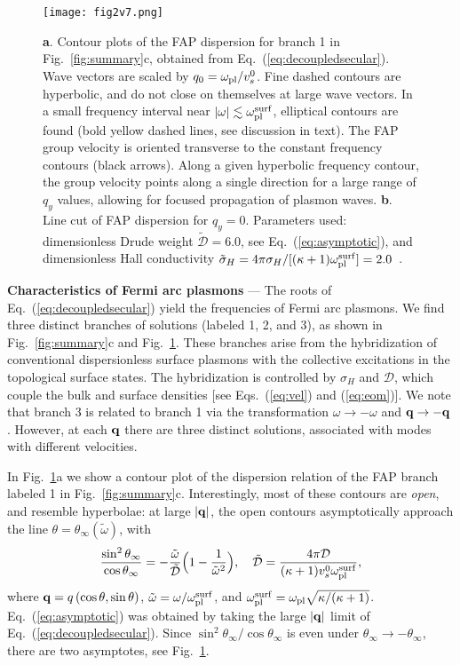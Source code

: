 \documentclass[aps,twocolumn,prl,groupedaddress]{revtex4}
\newcommand{\be}{\begin{equation}}
\newcommand{\ee}{\end{equation}}
\renewcommand{\vec}[1]{{\bf #1}}
\begin{document}
\begin{figure}[t]
\texttt{[image: fig2v7.png]}
\caption{{\bf a}. Contour plots of the FAP dispersion for branch 1 
in Fig.~\ref{fig:summary}c, obtained from Eq.~(\ref{eq:decoupledsecular}). 
Wave vectors are scaled by $q_0=\omega_{\rm pl}/v_s^{0}$.
Fine dashed contours are hyperbolic, and do not close on themselves at large wave vectors.
In a small frequency interval near $|\omega| \lesssim \omega_{\rm pl}^{\rm surf}$, elliptical contours are found (bold yellow dashed lines, see discussion in text).
The FAP group velocity is oriented transverse to the constant frequency contours (black arrows).
Along a given hyperbolic frequency contour, the group velocity points along a single direction for a large range of $q_y$ values, allowing for focused propagation of plasmon waves.
{\bf b}. Line cut of FAP dispersion for $q_y=0$. 
Parameters used: dimensionless Drude weight $\tilde{\mathcal{D}} = 6.0$, see Eq.~(\ref{eq:asymptotic}), and dimensionless Hall conductivity $\tilde{\sigma}_H =4\pi \sigma_H/[(\kappa +1) \omega_{\rm pl}^{\rm surf} ]=2.0$~\cite{parameters}.
}
\label{fig:dispersion}
\end{figure}

\vspace{2mm}
{\bf Characteristics of Fermi arc plasmons} --- The roots of Eq.~(\ref{eq:decoupledsecular}) yield the frequencies of Fermi arc plasmons. We find three distinct branches of solutions (labeled 1, 2, and 3), as shown in Fig.~\ref{fig:summary}c and Fig.~\ref{fig:dispersion}. 
These branches arise from the hybridization of conventional dispersionless surface plasmons with the collective excitations in the topological surface states. 
The hybridization is controlled by $\sigma_H$ and $\mathcal{D}$, which couple the bulk and surface densities [see Eqs.~(\ref{eq:vel}) and (\ref{eq:eom})]. 
We note that branch 3 is related to branch 1 via the transformation $\omega \to - \omega$ and $\vec q \to -\vec q$.
However, at each $\vec q$ there are three distinct solutions, associated with modes with different velocities.

In Fig.~\ref{fig:dispersion}a we show a contour plot of 
the dispersion relation of the FAP branch labeled 1 in Fig.~\ref{fig:summary}c. 
Interestingly, most of these contours are {\it open}, and resemble hyperbolae: at large $|\vec q|$, the open contours asymptotically approach the line $\theta = \theta_\infty(\tilde\omega)$, with 
\be
\frac{\sin^2\theta_\infty}{\cos\theta_\infty}= - \frac{\tilde{\omega}}{\tilde{\mathcal{D}}} \Big( 1- \frac{1}{\tilde{\omega}^2}\Big),\quad \tilde{\mathcal{D}} = \frac{4\pi \mathcal{D}}{(\kappa+1) v_s^0 \omega_{\rm pl}^{\rm surf}},
\label{eq:asymptotic}
\ee
where $\vec{q} = q\,(\cos\theta, \sin\theta)$,  $ \tilde\omega = \omega/\omega_{\rm pl}^{\rm surf}$, and $ \omega_{\rm pl}^{\rm surf}= \omega_{\rm pl}\sqrt{\kappa/(\kappa+1)}$. 
Eq.~(\ref{eq:asymptotic}) was obtained by taking the large $|\vec q|$ limit of Eq.~(\ref{eq:decoupledsecular}). 
Since $\sin^2\theta_\infty/\cos\theta_\infty$ 
is even under $\theta_\infty \to - \theta_\infty$, there are two asymptotes, see 
Fig.~\ref{fig:dispersion}. 
\end{document}
